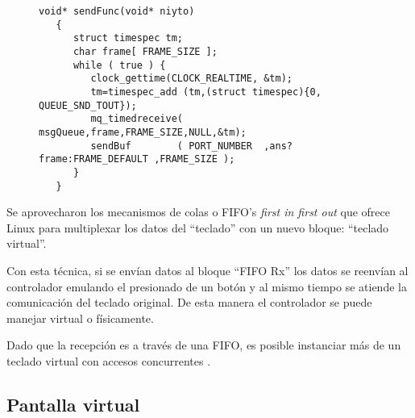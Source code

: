 \begin{figure}[!h]
   \begin{lstlisting}[label={cod:handheld3},caption={Tarea de multiplexado de los datos del teclado físico y virtual.}]
   void* sendFunc(void* niyto)
   {
      struct timespec tm;
      char frame[ FRAME_SIZE ];
      while ( true ) {
         clock_gettime(CLOCK_REALTIME, &tm);
         tm=timespec_add (tm,(struct timespec){0, QUEUE_SND_TOUT});
         mq_timedreceive( msgQueue,frame,FRAME_SIZE,NULL,&tm);
         sendBuf        ( PORT_NUMBER  ,ans?frame:FRAME_DEFAULT ,FRAME_SIZE );
      }
   }
   \end{lstlisting}
\end{figure}

   Se aprovecharon los mecanismos de colas o FIFO's \textit{first in first out} que ofrece Linux para multiplexar los datos del ``teclado'' con un nuevo bloque: ``teclado virtual''.\par
      Con esta técnica, si se envían datos al bloque ``FIFO Rx'' los datos se reenvían al controlador emulando el presionado de un botón y al mismo tiempo se atiende la comunicación del teclado original.
      De esta manera el controlador se puede manejar virtual o físicamente.\par
      Dado que la recepción es a través de una FIFO, es posible instanciar más de un teclado virtual con accesos concurrentes \citep{embeddedprimer}.

\subsection{Pantalla virtual}

